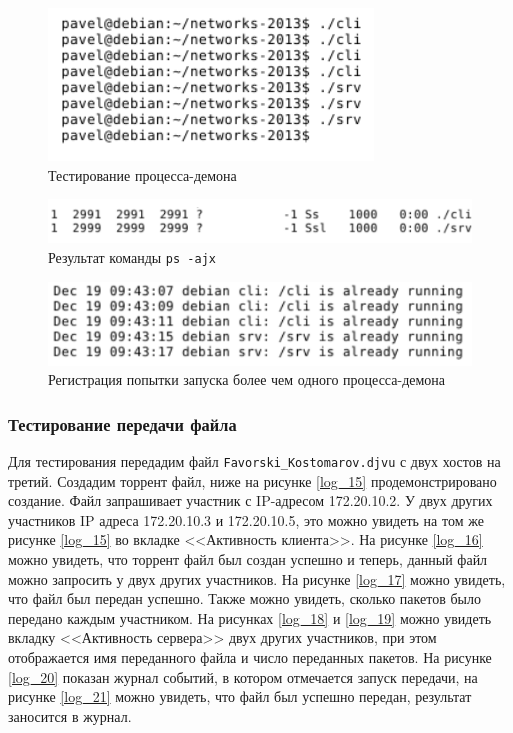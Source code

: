 \begin{figure}[!hbt]
    \centering
    \includegraphics{log_9}
    \caption{Тестирование процесса-демона}\label{log_9}
\end{figure}
\begin{figure}[!hbt]
    \centering
    \includegraphics{log_13}
    \caption{Результат команды \texttt{ps -ajx}}\label{log_13}
\end{figure}
\begin{figure}[!hbt]
    \centering
    \includegraphics{log_14}
    \caption{Регистрация попытки запуска более чем одного процесса-демона}\label{log_14}
\end{figure}

\subsubsection*{Тестирование передачи файла}
Для тестирования передадим файл \texttt{Favorski\_Kostomarov.djvu} с двух хостов на
третий.
\newpar
Создадим торрент файл, ниже на рисунке \ref{log_15} продемонстрировано создание.
Файл запрашивает участник с IP-адресом 172.20.10.2. У двух других
участников IP адреса 172.20.10.3 и 172.20.10.5, это можно увидеть на том же
рисунке \ref{log_15} во вкладке <<Активность клиента>>. На рисунке \ref{log_16} можно увидеть,
что торрент файл был создан успешно и теперь, данный файл можно
запросить у двух других участников. На рисунке \ref{log_17} можно увидеть, что файл
был передан успешно. Также можно увидеть, сколько пакетов было передано
каждым участником. На рисунках \ref{log_18} и \ref{log_19} можно увидеть вкладку
<<Активность сервера>> двух других участников, при этом отображается имя
переданного файла и число переданных пакетов. На рисунке \ref{log_20} показан
журнал событий, в котором отмечается запуск передачи, на рисунке \ref{log_21} можно
увидеть, что файл был успешно передан, результат заносится в журнал.

